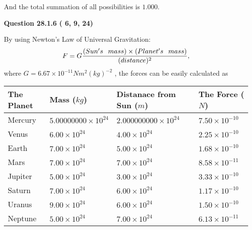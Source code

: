 \documentclass[12pt]{article}
\begin{document}
\noindent
 And the total summation of all possibilities is $  %
1.000 $.
 
 
 
  
\vspace{0.2in}
  
{\textbf{\Large{Question
28.1.6 
 (          6,          9,         24)
}}}
  
  
 
 
\noindent{}

By using Newton's Law of Universal Gravitation:
\[
F=G \frac{(Sun's \hspace{0.1in} mass) \times (Planet's \hspace{0.1in} mass)} { (distance)^2},
\]
where
$ G= %
6.67 \times 10^{-11}N m^{2}(kg)^{-2}$ , the forces can be easily calculated as
 
\vspace{0.2in}
 
 
\begin{tabular}{|l|l|l|l|}
\hline
The Planet & Mass ($kg$) & Distanace from Sun ($m$) & The Force ($N$)\\
\hline
Mercury  &
           $ %
5.00000000 \times 10^{24} $   &
             $ %
2.000000000 \times 10^{24} $    & $ %
7.50 \times 10^{-10} $
\\  \hline
Venus    &
           $  %
6.00 \times 10^{24}  $     &
             $ %
4.00 \times 10^{24} $    & $ %
2.25 \times 10^{-10} $
\\  \hline
Earth    &
           $  %
7.00 \times 10^{24}  $     &
             $ %
5.00 \times 10^{24} $    & $ %
1.68 \times 10^{-10} $
\\   \hline
Mars     &
           $  %
7.00 \times 10^{24} $     &
             $ %
7.00 \times 10^{24} $    & $ %
8.58 \times 10^{-11} $
\\   \hline
Jupiter  &
           $  %
5.00 \times 10^{24} $    &
             $ %
3.00 \times 10^{24} $    & $ %
3.33 \times 10^{-10} $
\\  \hline
Saturn   &
           $  %
7.00 \times 10^{24} $    &
             $ %
6.00 \times 10^{24}  $    & $ %
1.17 \times 10^{-10} $
\\  \hline
Uranus   &
           $  %
9.00 \times 10^{24} $    &
             $ %
6.00 \times 10^{24} $    & $ %
1.50 \times 10^{-10} $
\\  \hline
Neptune  &
           $  %
5.00 \times 10^{24} $    &
             $ %
7.00 \times 10^{24} $    & $ %
6.13 \times 10^{-11} $
\\  \hline
 
\end{tabular}
 
\end{document}
